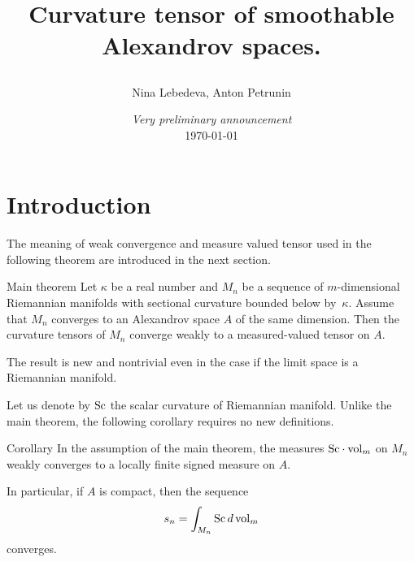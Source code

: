 \documentclass[a4paper,10pt]{article}
\begin{document}
\title{Curvature tensor of smoothable Alexandrov spaces. 
\date{{\it Very preliminary announcement} \\ \today}
}
\author{Nina Lebedeva, Anton Petrunin}
\maketitle

\tableofcontents

\newcommand{\Test}{\operatorname{Test}}
\newcommand{\Al}{\mathcal{A}lex} 
\newcommand{\All}{\mathcal{A}lex_{loc}} 
\newcommand{\DAl}{\mathcal{DA}lex}
\newcommand{\DM}{\mathcal{DM}}
\newcommand{\rcd}{\operatorname{RCD}}
\newcommand{\dccto}{\stackrel{DC_{Alex}}{\longrightarrow}}
\newcommand{\cccto}{\stackrel{C^0_c}{\longrightarrow}}
\newcommand{\C}{\mathfrak{C}}
\newcommand{\vv}{\mathfrak{v}}
\newcommand{\ep}{\varepsilon}

\section{Introduction}

The meaning of weak convergence and measure valued tensor used in the following theorem are introduced in the next section.

\begin{thm}{Main theorem}
Let $\kappa$ be a real number and 
$M_n$ be a sequence of $m$-dimensional Riemannian manifolds with sectional curvature bounded below by~$\kappa$.
Assume that $M_n$ converges to an Alexandrov space $A$ of the same dimension.
Then the curvature tensors of $M_n$ converge weakly to a measured-valued tensor on $A$.
\end{thm}

The result is new and nontrivial even
in the case if the limit space is
a Riemannian manifold.

Let us denote by $\operatorname{Sc}$ the scalar curvature of Riemannian manifold.
Unlike the main theorem, the following corollary requires no new definitions.


\begin{thm}{Corollary}
In the assumption of the main theorem,
the measures $\Sc\cdot \vol_m$ on $M_n$ weakly converges to a locally finite signed measure  on $A$.

In particular, if $A$ is compact, then the sequence
\[s_n=\int_{M_n}\operatorname{Sc} d\operatorname{vol}_m\]
converges.
\end{thm}
\end{document}
